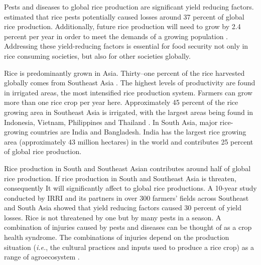 
Pests and diseases to global rice production are significant yield reducing factors.  estimated that rice pests potentially caused losses around 37 percent of global rice production. Additionally, future rice production will need to grow by 2.4 percent per year in order to meet the demands of a growing population . Addressing these yield-reducing factors is essential for food security not only in rice consuming societies, but also for other societies globally.

Rice is predominantly grown in Asia. Thirty--one percent of the rice harvested globally comes from Southeast Asia . The highest levels of productivity are found in irrigated areas, the most intensified rice production system. Farmers can grow more than one rice crop per year here. Approximately 45 percent of the rice growing area in Southeast Asia is irrigated, with the largest areas being found in Indonesia, Vietnam, Philippines and Thailand . In South Asia, major rice-growing countries are India and Bangladesh. India has the largest rice growing area (approximately 43 million hectares) in the world and contributes 25 percent of global rice production. 


Rice production in South and Southeast Asian contributes around half of global rice production. If rice production in South and Southeast Asia is threaten, consequently It will significantly affect to global rice productions. A 10-year study conducted by IRRI and its partners  in over 300 farmers’ fields across Southeast and South Asia showed that yield reducing factors caused 30 percent of yield losses. Rice is not threatened by one but by many pests in a season. A combination of injuries caused by pests and diseases can be thought of as a crop health syndrome. The combinations of injuries depend on the production situation (\textit{i.e.}, the cultural practices and inputs used to produce a rice crop) as a range of agroecosystem .

